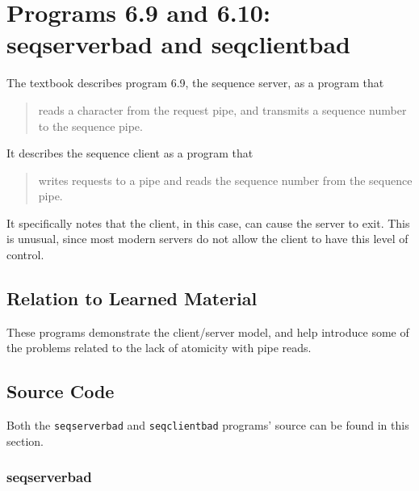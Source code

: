 \documentclass[letter,12pt,sffamily]{article}
\begin{document}
\section{Programs 6.9 and 6.10: seqserverbad and seqclientbad}
The textbook describes program 6.9, the sequence server, as a program that \blockquote{reads a character from the request pipe, and transmits a sequence number to the sequence pipe.} It describes the sequence client as a program that \blockquote{writes requests to a pipe and reads the sequence number from the sequence pipe.} It 
specifically notes that the client, in this case, can cause the server to exit. This is unusual, since most modern servers do not allow the client to have this level
of control.
\subsection{Relation to Learned Material}
These programs demonstrate the client/server model, and help introduce some of the problems related to the lack of atomicity with pipe reads.
\subsection{Source Code}
Both the \texttt{seqserverbad} and \texttt{seqclientbad} programs' source can be found in this section.
\subsubsection{seqserverbad}
\renewcommand{\theFancyVerbLine}{
	\sffamily\textcolor[rgb]{0.5,0.5,0.5}{\scriptsize\arabic{FancyVerbLine}}}
\end{document}
